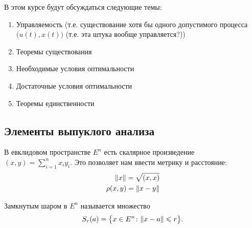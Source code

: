 \vspace{1cm}
В этом курсе будут обсуждаться следующие темы:
\begin{enumerate}
    \item Управляемость (т.е. существование хотя бы одного допустимого процесса $\bigl(u(t), x(t)\bigr)$ (т.е. эта штука вообще управляется?))
    \item Теоремы существования 
    \item Необходимые условия оптимальности 
    \item Достаточные условия оптимальности
    \item Теоремы единственности
\end{enumerate}

\subsection{Элементы выпуклого анализа}

В евклидовом пространстве $E^n$ есть скалярное произведение $(x, y) = \sum\limits_{i = 1}^{n} x_i y_i$.
Это позволяет нам ввести метрику и расстояние:
\begin{align}
    \lVert x \rVert = \sqrt{(x,x)} \\
    \rho(x, y) = \lVert x-y \rVert
\end{align}

\begin{defn}
    \label{lection2:ball}
    Замкнутым шаром в $E^n$ называется множество
    \begin{equation}
        S_r(a) = \bigl\{ x \in E^n \colon \lVert x - a \rVert \leqslant r \bigr\}.
    \end{equation}
\end{defn}

